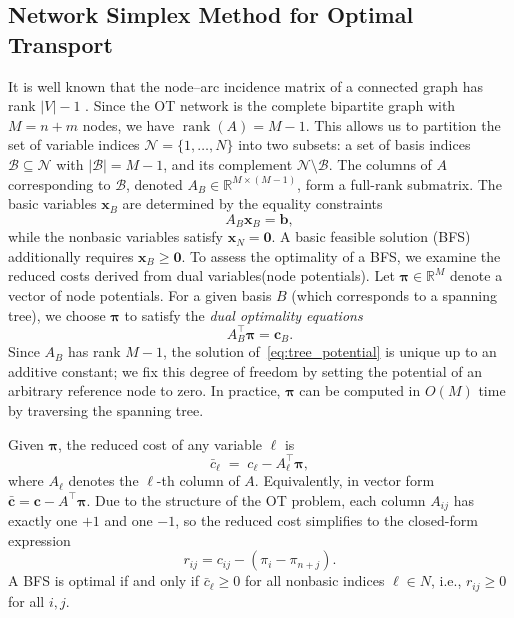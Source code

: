 \documentclass[12pt,a4paper]{article}
\DeclareMathOperator{\rank}{rank}
\begin{document}
\subsection{Network Simplex Method for Optimal Transport}

It is well known that the node--arc incidence matrix of a connected graph has rank
$\lvert V\rvert-1$ \cite{ahuja1993networkflows}.
Since the OT network is the complete bipartite graph with $M=n+m$ nodes, we have
$\rank(A)=M-1$. This allows us to partition the set of variable indices \( \mathcal{N}=\{1, \dots, N\} \) into two subsets: a set of basis indices \( \mathcal{B} \subseteq \mathcal{N} \) with \( | \mathcal{B}| = M - 1 \), and its complement \( \mathcal{N} \setminus \mathcal{B} \). The columns of \( A \) corresponding to \( \mathcal{B} \), denoted \( A_B \in \mathbb{R}^{M \times (M-1)} \), form a full-rank submatrix. 
The basic variables $\mathbf{x}_B$ are determined by the equality constraints
\[
A_B \mathbf{x}_B = \mathbf{b},
\]
while the nonbasic variables satisfy $\mathbf{x}_N=\mathbf{0}$.
A basic feasible solution (BFS) additionally requires $\mathbf{x}_B\ge \mathbf{0}$.
To assess the optimality of a BFS, we examine the reduced costs derived from dual variables(node potentials).
Let $\boldsymbol{\pi}\in\mathbb{R}^{M}$ denote a vector of node potentials.
For a given basis $B$ (which corresponds to a spanning tree),
we choose $\boldsymbol{\pi}$ to satisfy the \emph{dual optimality equations}
\begin{equation}\label{eq:tree_potential}
A_B^\top \boldsymbol{\pi} = \mathbf{c}_B .
\end{equation}
Since $A_B$ has rank $M-1$, the solution of~\eqref{eq:tree_potential} is unique up to an additive constant;
we fix this degree of freedom by setting the potential of an arbitrary reference node to zero.
In practice, $\boldsymbol{\pi}$ can be computed in $O(M)$ time by traversing the spanning tree.

Given $\boldsymbol{\pi}$, the reduced cost of any variable $\ell$ is
\begin{equation}\label{eq:reduced_cost}
\bar c_\ell \;=\; c_\ell - A_\ell^\top \boldsymbol{\pi},
\end{equation}
where $A_\ell$ denotes the $\ell$-th column of $A$.
Equivalently, in vector form $\bar{\mathbf{c}} = \mathbf{c} - A^\top \boldsymbol{\pi}$.
Due to the structure of the OT problem, each column \( A_{ij} \) has exactly one \( +1 \) and one \( -1 \), so the reduced cost simplifies to the closed-form expression
\[
r_{ij} = c_{ij} - (\pi_i - \pi_{n+j}).
\]
A BFS is optimal if and only if $\bar c_\ell \ge 0$ for all nonbasic indices $\ell\in N$, i.e., \( r_{ij} \ge 0 \) for all \( i, j \). 
\end{document}
